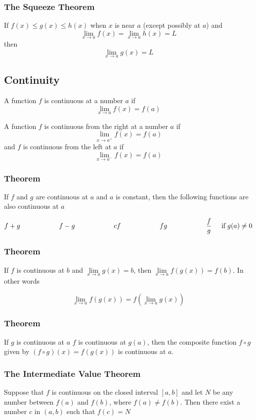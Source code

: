 \documentclass{article}
\begin{document}
\subsubsection*{The Squeeze Theorem}
If \( f(x) \leq g(x) \leq h(x)\) when \( x \) is near \( a \) (except possibly at \( a \)) and
\[
\lim_{x \to a} f(x) = \lim_{x \to a} h(x) = L
\]
then
\[
\lim_{x \to a} g(x) = L
\]

\subsection*{Continuity}
A function \(f\) is continuous at a number \(a\) if
\[
\lim_{x \to a} f(x) = f(a)
\]

A function \(f\) is continuous from the right at a number \(a\) if
\[
\lim_{x \to a^+} f(x) = f(a)
\]
and \(f\) is continuous from the left at \(a\) if
\[
\lim_{x \to a^-} f(x) = f(a)
\]

\subsubsection*{Theorem} 
If \(f\) and \(g\) are continuous at \(a\) and \(a\) is constant, then the following functions are also continuous at \(a\)

\[
f + g \hspace{2cm} f-g \hspace{2cm} cf \hspace{2cm} fg \hspace{2cm} \frac{f}{g}  \hspace{.5cm} \text{if} \;  g(a) \neq 0
\]

\subsubsection*{Theorem} 
If \(f\) is continuous at \(b\) and \( \lim\limits_{x \to a} g(x) = b\), then  \( \lim\limits_{x \to a} f(g(x)) = f(b)\).
In other words

\[
\lim_{x \to a} f(g(x)) = f(\lim\limits_{x \to a} g(x))
\]

\subsubsection*{Theorem} 
If \(g\) is continuous at \(a\) \(f\) is continuous at \(g(a)\), then the composite function \(f\circ g\) given by \((f\circ g)(x) = f(g(x))\) is continuous at \(a\).

\subsubsection*{The Intermediate Value Theorem} 
Suppose that \(f\) is continuous on the closed interval \( \left[a,b\right] \) and let \(N\) be any number between \(f(a)\) and \(f(b)\), where \(f(a) \neq f(b)\). Then there exist a number \(c\) in \((a,b)\) such that \(f(c)=N\)
\end{document}
